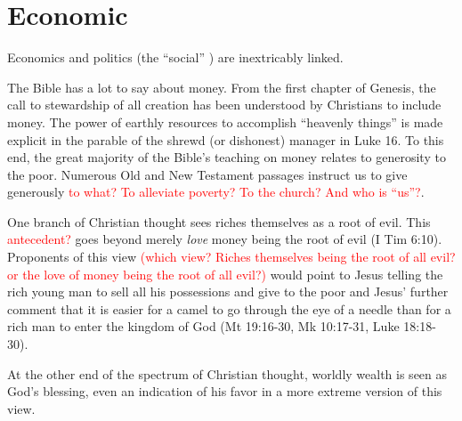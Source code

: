 \documentclass[12pt]{article}
\newcommand{\ins}[1]{\textcolor{red}{#1}}
\begin{document}


%
%
%



\section{Economic}
\label{sec:economic}

Economics and politics (the ``social'' ) are inextricably linked.

The Bible has a lot to say about money. From the first chapter of Genesis, the call to
stewardship of all creation has been understood by Christians to include money. The power
of earthly resources to accomplish ``heavenly things'' is made explicit in the parable of
the shrewd (or dishonest) manager in Luke 16. To this end, the great majority of the
Bible's teaching on money relates to generosity to the poor. Numerous Old and New
Testament passages instruct us to give generously 
\ins{to what? To alleviate poverty? To the church?  And who is ``us''?}.

One branch of Christian thought sees riches themselves as a root of evil. 
This \ins{antecedent?} goes beyond
merely \emph{love} money being the root of evil (I Tim 6:10). Proponents of this view
\ins{(which view? Riches themselves being the root of all evil?
or the love of money being the root of all evil?)}
would point to Jesus telling the rich young man to sell all his possessions and give to
the poor and Jesus' further comment that it is easier for a camel to go through the eye of
a needle than for a rich man to enter the kingdom of God (Mt 19:16-30, Mk 10:17-31, Luke
18:18-30).

At the other end of the spectrum of Christian thought, worldly wealth is seen as God's
blessing, even an indication of his favor in a more extreme version of this view.
\end{document}
